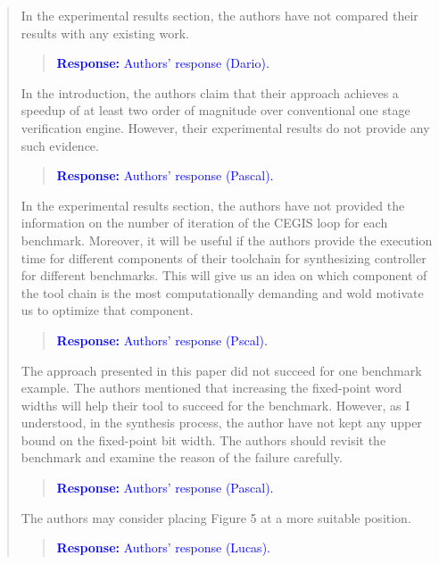 \documentclass[11pt]{article}
\begin{document}
\begin{quote}
In the experimental results section, the authors have not compared their results with any existing work. 

\begin{quote}
\textcolor{blue}{\textbf{Response:} Authors' response (Dario).}
\end{quote}

In the introduction, the authors claim that their approach achieves a speedup of at least two order of magnitude over conventional one stage verification engine. However, their experimental results do not provide any such evidence.

\begin{quote}
\textcolor{blue}{\textbf{Response:} Authors' response (Pascal).}
\end{quote}

In the experimental results section, the authors have not provided the information on the number of iteration of the CEGIS loop for each benchmark. Moreover, it will be useful if the authors provide the execution time for different components of their toolchain for synthesizing controller for different benchmarks. This will give us an idea on which component of the tool chain is the most computationally demanding and wold motivate us to optimize that component.

\begin{quote}
\textcolor{blue}{\textbf{Response:} Authors' response (Pscal).}
\end{quote}

The approach presented in this paper did not succeed for one benchmark example. The authors mentioned that increasing the fixed-point word widths will help their tool to succeed for the benchmark. However, as I understood, in the synthesis process, the author have not kept any upper bound on the fixed-point bit width. The authors should revisit the benchmark and examine the reason of the failure carefully.

\begin{quote}
\textcolor{blue}{\textbf{Response:} Authors' response (Pascal).}
\end{quote}

The authors may consider placing Figure 5 at a more suitable position.


\begin{quote}
\textcolor{blue}{\textbf{Response:} Authors' response (Lucas).}
\end{quote}

\end{quote}
\end{document}
